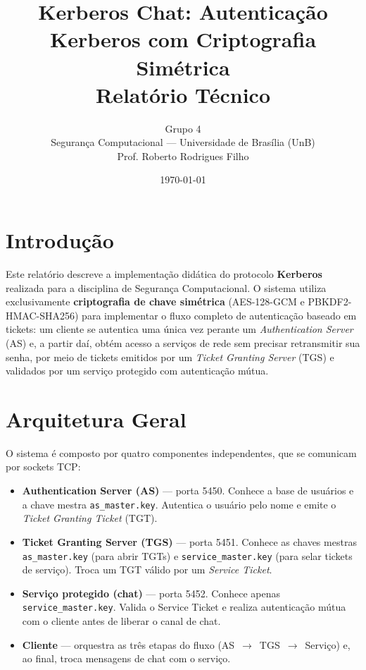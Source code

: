 \documentclass[11pt,a4paper]{article}
\title{\textbf{Kerberos Chat: Autenticação Kerberos com Criptografia Simétrica}\\
\large Relatório Técnico}
\author{Grupo 4 \\ \small Segurança Computacional --- Universidade de Brasília (UnB) \\ \small Prof. Roberto Rodrigues Filho}
\date{\today}
\begin{document}
\maketitle
\thispagestyle{empty}

\section{Introdução}

Este relatório descreve a implementação didática do protocolo \textbf{Kerberos} realizada
para a disciplina de Segurança Computacional. O sistema utiliza exclusivamente
\textbf{criptografia de chave simétrica} (AES-128-GCM e PBKDF2-HMAC-SHA256) para implementar
o fluxo completo de autenticação baseado em tickets: um cliente se autentica uma única vez
perante um \emph{Authentication Server} (AS) e, a partir daí, obtém acesso a serviços de rede
sem precisar retransmitir sua senha, por meio de tickets emitidos por um \emph{Ticket Granting
Server} (TGS) e validados por um serviço protegido com autenticação mútua.

\section{Arquitetura Geral}

O sistema é composto por quatro componentes independentes, que se comunicam por sockets
TCP:

\begin{itemize}
    \item \textbf{Authentication Server (AS)} --- porta 5450. Conhece a base de usuários
    e a chave mestra \texttt{as\_master.key}. Autentica o usuário pelo nome e emite o
    \emph{Ticket Granting Ticket} (TGT).
    \item \textbf{Ticket Granting Server (TGS)} --- porta 5451. Conhece as chaves mestras
    \texttt{as\_master.key} (para abrir TGTs) e \texttt{service\_master.key} (para selar
    tickets de serviço). Troca um TGT válido por um \emph{Service Ticket}.
    \item \textbf{Serviço protegido (chat)} --- porta 5452. Conhece apenas
    \texttt{service\_master.key}. Valida o Service Ticket e realiza autenticação mútua
    com o cliente antes de liberar o canal de chat.
    \item \textbf{Cliente} --- orquestra as três etapas do fluxo (AS~$\to$~TGS~$\to$~Serviço)
    e, ao final, troca mensagens de chat com o serviço.
\end{itemize}
\end{document}
